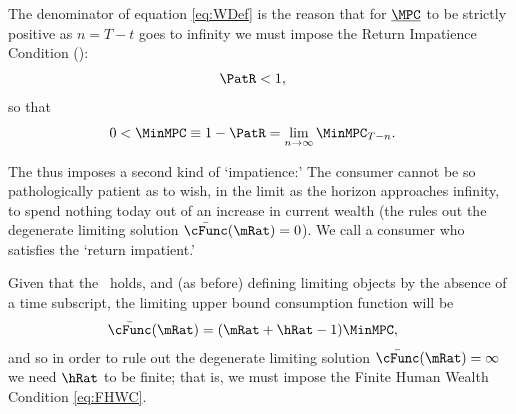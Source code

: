 \documentclass[BufferStockTheory]{subfiles}
\begin{document}
The denominator of equation \eqref{eq:WDef} is the reason that for $\underbar{\MPC}$ to be strictly positive as $n=T-t$ goes to infinity we must impose the Return Impatience Condition (\RIC):
\begin{align}
  \PatR  & < 1   \label{eq:RIC},
\end{align}
so that
\begin{align}
  0 <  \MinMPC  & \equiv   1-\PatR = \lim_{n \rightarrow \infty} \MinMPC_{T-n} \label{eq:MinMPCDef}
                  .
\end{align}

The {\RIC} thus imposes a second kind of `impatience:' The consumer cannot be so pathologically patient as to wish, in the limit as the horizon approaches infinity, to spend nothing today out of an increase in current wealth (the {\RIC} rules out the degenerate limiting solution $\bar{\cFunc}(\mRat)=0$).  We call a consumer who satisfies the {\RIC} `return impatient.'

Given that the {\RIC}~holds, and (as before) defining limiting objects by the absence of a time subscript, the limiting upper bound consumption function will be
\begin{align}\label{eq:cFuncPFUnc}
  \bar{\cFunc}(\mRat)  & = (\mRat+\hRat-1)\MinMPC, 
\end{align}
and so in order to rule out the degenerate limiting
solution $\bar{\cFunc}(\mRat) = \infty$ we need $\hRat$ to be finite; that is, we
must impose the Finite Human Wealth Condition \eqref{eq:FHWC}.

\hypertarget{ValuePFAnalytical}{}
\hypertarget{Autarky-Value-PF}{}
\end{document}
